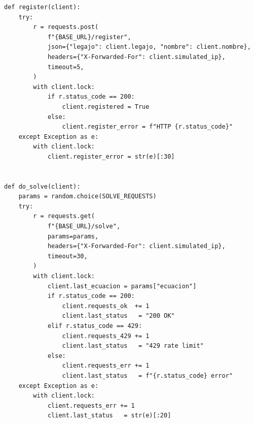 \documentclass[12pt, a4paper]{article}
\begin{document}
\begin{lstlisting}[style=python, caption={Registro y envío de solicitudes durante la prueba de carga}]
def register(client):
    try:
        r = requests.post(
            f"{BASE_URL}/register",
            json={"legajo": client.legajo, "nombre": client.nombre},
            headers={"X-Forwarded-For": client.simulated_ip},
            timeout=5,
        )
        with client.lock:
            if r.status_code == 200:
                client.registered = True
            else:
                client.register_error = f"HTTP {r.status_code}"
    except Exception as e:
        with client.lock:
            client.register_error = str(e)[:30]


def do_solve(client):
    params = random.choice(SOLVE_REQUESTS)
    try:
        r = requests.get(
            f"{BASE_URL}/solve",
            params=params,
            headers={"X-Forwarded-For": client.simulated_ip},
            timeout=30,
        )
        with client.lock:
            client.last_ecuacion = params["ecuacion"]
            if r.status_code == 200:
                client.requests_ok  += 1
                client.last_status   = "200 OK"
            elif r.status_code == 429:
                client.requests_429 += 1
                client.last_status   = "429 rate limit"
            else:
                client.requests_err += 1
                client.last_status   = f"{r.status_code} error"
    except Exception as e:
        with client.lock:
            client.requests_err += 1
            client.last_status   = str(e)[:20]
\end{lstlisting}
\end{document}
